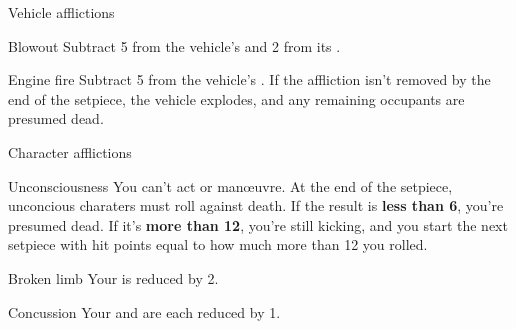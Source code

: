 
\begin{abstractsection}{Vehicle afflictions}
\vspace{1ex}

\begin{describe}{Blowout}
  Subtract 5 from the vehicle's  and 2 from its .
\end{describe}

\begin{describe}{Engine fire}
  Subtract 5 from the vehicle's . If the affliction isn't removed by the end of the setpiece, the vehicle explodes, and any remaining occupants are presumed dead.
\end{describe}
\end{abstractsection}

\begin{abstractsection}{Character afflictions}
\vspace{1ex}

\begin{describe}{Unconsciousness}
  You can't act or man\oe{}uvre. At the end of the setpiece, unconcious charaters must roll  against death. If the result is \textbf{less than 6}, you're presumed dead. If it's \textbf{more than 12}, you're still kicking, and you start the next setpiece with hit points equal to how much more than 12 you rolled.
\end{describe}

\begin{describe}{Broken limb}
  Your  is reduced by 2.
\end{describe}

\begin{describe}{Concussion}
  Your  and  are each reduced by 1.
\end{describe}

\end{abstractsection}
